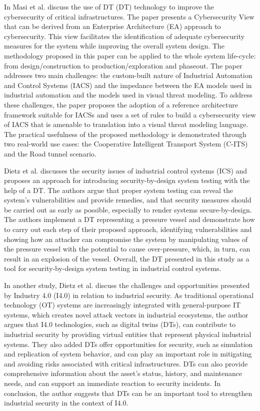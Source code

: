 In\cite{masiSecuringCriticalInfrastructures2023} Masi et al. discuss the  use of DT (DT) technology to improve the cybersecurity of critical infrastructures. The paper presents a Cybersecurity View that can be derived from an Enterprise Architecture (EA) approach to cybersecurity. This view facilitates the identification of adequate cybersecurity measures for the system while improving the overall system design. The methodology proposed in this paper can be applied to the whole system life-cycle: from design/construction to production/exploration and phaseout. The paper addresses two main challenges: the custom-built nature of Industrial Automation and Control Systems (IACS) and the impedance between the EA models used in industrial automation and the models used in visual threat modeling. To address these challenges, the paper proposes the adoption of a reference architecture framework suitable for IACSs and uses a set of rules to build a cybersecurity view of IACS that is amenable to translation into a visual threat modeling language.  The practical usefulness of the proposed methodology is demonstrated through two real-world use cases: the Cooperative Intelligent Transport System (C-ITS) and the Road tunnel scenario. 

Dietz et al.\cite{dietzEmployingDigitalTwins2022} discusses the security issues of industrial control systems (ICS) and proposes an approach for introducing security-by-design system testing with the help of a DT. The authors argue that proper system testing can reveal the system’s vulnerabilities and provide remedies, and that security measures should be carried out as early as possible, especially to render systems secure-by-design. The authors implement a DT representing a pressure vessel and demonstrate how to carry out each step of their proposed approach, identifying vulnerabilities and showing how an attacker can compromise the system by manipulating values of the pressure vessel with the potential to cause over-pressure, which, in turn, can result in an explosion of the vessel. Overall, the DT presented in this study as a tool for security-by-design system testing in industrial control systems.


In another study, Dietz et al.\cite{dietzUnleashingDigitalTwin2020} discuss the challenges and opportunities presented by Industry 4.0 (I4.0) in relation to industrial security. As traditional operational technology (OT) systems are increasingly integrated with general-purpose IT systems, which creates novel attack vectors in industrial ecosystems, the author argues that I4.0 technologies, such as digital twins (DTs), can contribute to industrial security by providing virtual entities that represent physical industrial systems. They also added DTs offer opportunities for security, such as simulation and replication of system behavior, and can play an important role in mitigating and avoiding risks associated with critical infrastructures. DTs can also provide comprehensive information about the asset's status, history, and maintenance needs, and can support an immediate reaction to security incidents. In conclusion, the author suggests that DTs can be an important tool to strengthen industrial security in the context of I4.0.


